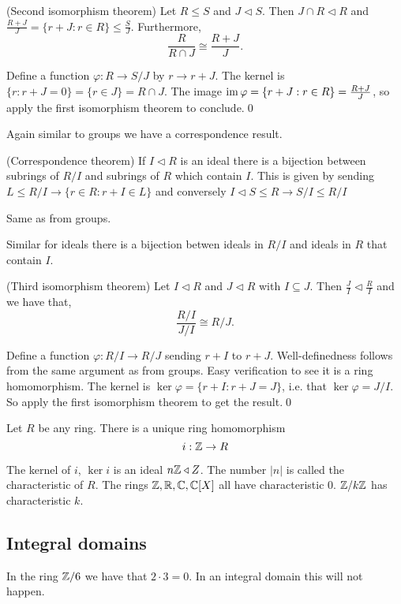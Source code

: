 \documentclass{article}
\newcommand{\nrm}{\triangleleft}
\begin{document}
\begin{theorem}
	(Second isomorphism theorem) Let $ R\le S $ and $ J\nrm S $. Then $ J\cap R\nrm R $ and $ \frac{R+J}{J}=\{r+J:r\in R\}\le \frac SJ $. Furthermore,
	\[
		\frac{R}{R\cap J}\cong \frac{R+J}J.
	\]
\end{theorem}
\pf Define a function $ \varphi:R\to S/J $ by $ r\to r+J $. The kernel is $ \{r:r+J=0\}=\{r\in J\}=R\cap J $. The image $ \operatorname{im}\varphi=\{r+J:r\in R\}=\frac{R+J}J $, so apply the first isomorphism theorem to conclude.\qed
\par
Again similar to groups we have a correspondence result.
\begin{theorem}
	(Correspondence theorem) If $ I\nrm R $ is an ideal there is a bijection between subrings of $ R/I $ and subrings of $ R $ which contain $ I $. This is given by sending $ L\le R/I\to \{r\in R: r+I\in L\} $ and conversely $ I\nrm S\le R\to S/I\le R/I $
\end{theorem}
\pf Same as from groups.
\par
Similar for ideals there is a bijection betwen ideals in $ R/I $ and ideals in $ R $ that contain $ I $.
\begin{theorem}
	(Third isomorphism theorem) Let $ I\nrm R $ and $ J\nrm R $ with $ I\subseteq J $. Then $ \frac JI\nrm \frac RI $ and we have that,
	\[
		\frac{R/I}{J/I}\cong R/J.
	\]
\end{theorem}
\pf Define a function $\varphi: R/I\to R/J $ sending $ r+I $ to $ r+J $. Well-definedness follows from the same argument as from groups. Easy verification to see it is a ring homomorphism.
The kernel is $ \ker\varphi=\{r+I:r+J=J\} $, i.e. that $ \ker\varphi=J/I $. So apply the first isomorphism theorem to get the result.\qed
\begin{claim}
  Let $ R $ be any ring. There is a unique ring homomorphism
  \[
	  i:\mathbb{Z}\to R
  \]
\end{claim}
The kernel of $ i $, $ \ker i $ is an ideal $ n\Z\nrm Z $. The number $ |n| $ is called the characteristic of $ R $. The rings $ \mathbb{Z},\mathbb{R},\mathbb{C},\mathbb{C}[X] $ all have characteristic 0. $ \mathbb{Z}/k\mathbb{Z} $ has characteristic $ k $.
\subsection{Integral domains}
In the ring $ \mathbb{Z}/6 $ we have that $ 2\cdot 3 = 0 $. In an integral domain this will not happen.
\end{document}
